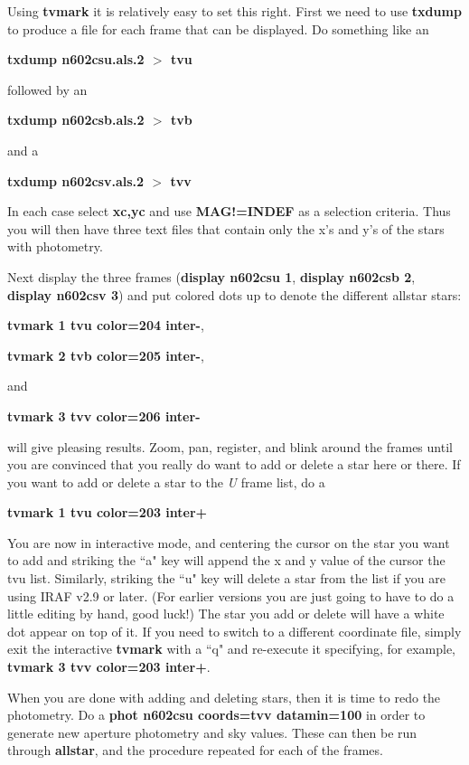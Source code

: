 Using {\bf tvmark} it is relatively easy to set this right.  First we
need to use {\bf txdump} to produce a file for each frame that can be
displayed.  Do something like an 
 
\centerline{ {\bf txdump n602csu.als.2 $>$ tvu}}
 
\noindent
followed by an 
 
\centerline{ {\bf txdump n602csb.als.2 $>$
tvb}} 
 
\noindent
and a 
 
\centerline{ {\bf
txdump n602csv.als.2 $>$ tvv}}
 
\noindent
In each case select {\bf xc,yc} and use
{\bf MAG!=INDEF} as a selection criteria.  Thus you will then have three text
files that contain only the x's and y's of the stars with photometry.
 
Next display the three frames ({\bf display n602csu 1}, {\bf display
n602csb 2}, {\bf display n602csv 3}) and put colored dots up to denote
the different allstar stars: 
 
\centerline{ {\bf tvmark 1 tvu color=204 inter-},}
 
\centerline{
{\bf tvmark 2 tvb color=205 inter-},}
 
\noindent
and 
 
\centerline{ {\bf tvmark 3 tvv color=206
inter-}}
 
\noindent
will give pleasing results.  Zoom, pan, register, and blink
around the frames until you are convinced that you really do want to
add or delete a star here or there.  If you want to add or delete a star to the
{\it U} frame list, do a 
 
\centerline{ {\bf tvmark 1 tvu color=203 inter+}}
 
\noindent  
You are
now in interactive mode, and centering the cursor on the star you want
to add and striking the ``a" key will append the x and y value of the
cursor the tvu list.  Similarly, striking the ``u" key
will delete a star from the list if you are using IRAF v2.9 or later.  
(For earlier versions you are just going to have to do a little
editing by hand, good luck!) The star you add or delete will have
a white dot appear on top of it. 
If you need to switch to a different coordinate file, simply exit the
interactive {\bf tvmark} with a ``q" and re-execute it specifying, for
example, {\bf tvmark 3 tvv color=203 inter+}. 
 
When you are done with adding and deleting stars, then it is time to
redo the photometry.  Do a {\bf phot n602csu coords=tvv datamin=100}
in order to generate new aperture photometry and sky values.  These
can then be run through {\bf allstar}, and the procedure repeated for
each
of the frames.
 

